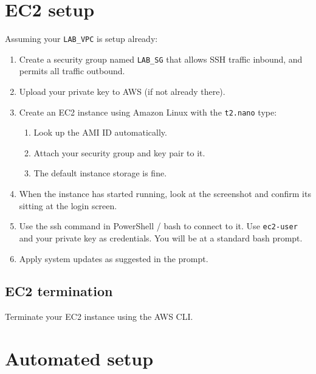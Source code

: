 \documentclass{pgnotes}
\begin{document}
\section{EC2 setup}

Assuming your \texttt{LAB\_VPC} is setup already: 

\begin{enumerate}
\item Create a security group named \texttt{LAB\_SG} that allows SSH traffic inbound, and permits all traffic outbound.
\item Upload your private key to AWS (if not already there). 
\item Create an EC2 instance using Amazon Linux with the \texttt{t2.nano} type:
  \begin{enumerate}
  \item Look up the AMI ID automatically.
  \item Attach your security group and key pair to it.
  \item The default instance storage is fine.
  \end{enumerate} 
\item When the instance has started running, look at the screenshot and confirm its sitting at the login screen.
\item Use the ssh command in PowerShell / bash to connect to it. Use \texttt{ec2-user} and your private key as credentials. You will be at a standard bash prompt.
\item Apply system updates as suggested in the prompt.
\end{enumerate}

\subsection{EC2 termination}

Terminate your EC2 instance using the AWS CLI. 


\section{Automated setup} 
\end{document}
